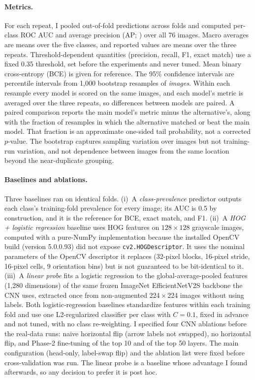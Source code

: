 \documentclass[11pt]{article}
\begin{document}
\paragraph{Metrics.} For each repeat, I pooled out-of-fold predictions across folds and computed per-class ROC AUC and average precision (AP; \citealt{saito2015}) over all 76 images. Macro averages are means over the five classes, and reported values are means over the three repeats. Threshold-dependent quantities (precision, recall, F1, exact match) use a fixed 0.35 threshold, set before the experiments and never tuned. Mean binary cross-entropy (BCE) is given for reference. The 95\% confidence intervals are percentile intervals from 1,000 bootstrap resamples of \emph{images}. Within each resample every model is scored on the same images, and each model's metric is averaged over the three repeats, so differences between models are paired. A paired comparison reports the main model's metric minus the alternative's, along with the fraction of resamples in which the alternative matched or beat the main model. That fraction is an approximate one-sided tail probability, not a corrected $p$-value. The bootstrap captures sampling variation over images but not training-run variation, and not dependence between images from the same location beyond the near-duplicate grouping.

\paragraph{Baselines and ablations.} Three baselines ran on identical folds. (i)~A \emph{class-prevalence} predictor outputs each class's training-fold prevalence for every image; its AUC is 0.5 by construction, and it is the reference for BCE, exact match, and F1. (ii)~A \emph{HOG + logistic regression} baseline uses HOG features on $128\times128$ grayscale images, computed with a pure-NumPy implementation because the installed OpenCV build (version 5.0.0.93) did not expose \texttt{cv2.HOGDescriptor}. It uses the nominal parameters of the OpenCV descriptor it replaces (32-pixel blocks, 16-pixel stride, 16-pixel cells, 9 orientation bins) but is not guaranteed to be bit-identical to it. (iii)~A \emph{linear probe} fits a logistic regression to the global-average-pooled features (1,280 dimensions) of the same frozen ImageNet EfficientNetV2S backbone the CNN uses, extracted once from non-augmented 224\,$\times$\,224 images without using labels. Both logistic-regression baselines standardize features within each training fold and use one L2-regularized classifier per class with $C=0.1$, fixed in advance and not tuned, with no class re-weighting. I specified four CNN ablations before the real-data runs: naive horizontal flip (arrow labels not swapped), no horizontal flip, and Phase-2 fine-tuning of the top 10 and of the top 50 layers. The main configuration (head-only, label-swap flip) and the ablation list were fixed before cross-validation was run. The linear probe is a baseline whose advantage I found afterwards, so any decision to prefer it is post hoc.
\end{document}

